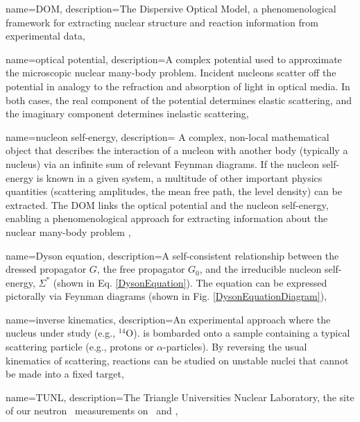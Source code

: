 \makenoidxglossaries

\GlsXtrEnablePreLocationTag{\textit{~}}{\textit{~}}
\renewcommand{\GlsXtrFormatLocationList}{\textit}

{
    name={DOM},
    description={The Dispersive Optical Model, a phenomenological framework for
    extracting nuclear structure and reaction information from experimental data},
}

{
    name={optical potential},
    description={A complex potential used to approximate the microscopic nuclear many-body problem. Incident nucleons scatter off the potential in analogy to the refraction and absorption of light in optical media.  In both cases, the real component of the potential determines elastic scattering, and the imaginary component determines inelastic scattering},
}

{
    name={nucleon self-energy},
    description={
        A complex, non-local mathematical object that describes the interaction of a
        nucleon with another body (typically a nucleus) via an infinite sum of relevant Feynman 
        diagrams. If the nucleon self-energy is known in a given system, a multitude of other 
        important physics quantities (scattering amplitudes, the mean free path, the level density) 
        can be extracted. The DOM links the optical potential and the nucleon
        self-energy, enabling a phenomenological approach for extracting
        information about the nuclear many-body problem
    },
}

{
    name={Dyson equation},
    description={A self-consistent relationship between the dressed propagator $G$, the free
        propagator $G_{0}$, and the irreducible nucleon self-energy, $\Sigma^{*}$ (shown in
        Eq. \ref{DysonEquation}). The equation can be expressed pictorally
        via Feynman diagrams (shown in Fig. \ref{DysonEquationDiagram})},
}

{
    name={inverse kinematics},
    description={An experimental approach where the nucleus under study
        (e.g., $^{14}$O). is bombarded onto a sample containing a typical
        scattering particle (e.g., protons or $\alpha$-particles).
        By reversing the usual kinematics of scattering,
        reactions can be studied on unstable nuclei that
    cannot be made into a fixed target},
}

{
    name={TUNL},
    description={The Triangle Universities Nuclear Laboratory, the site of our neutron \el\ 
        measurements on \snTwelve\ and \snFour},
}

